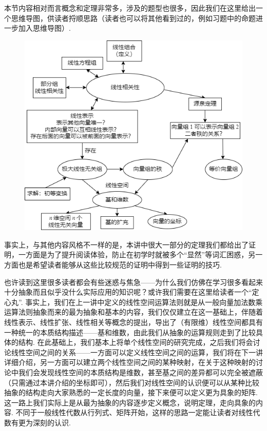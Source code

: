 \begin{summary}

    本节内容相对而言概念和定理非常多，涉及的题型也很多，因此我们在这里给出一个思维导图，供读者捋顺思路（读者也可以将其他看到过的，例如习题中的命题进一步加入思维导图）.
    \begin{figure}[htbp]
        \centering
        \includegraphics[scale=0.6]{figs/3-1.png}
    \end{figure}

    事实上，与其他内容风格不一样的是，本讲中很大一部分的定理我们都给出了证明，一方面是为了提升阅读体验，防止在初学时就被多个``显然''等词汇困惑，另一方面也是希望读者能够从这些比较规范的证明中得到一些证明的技巧.

    也许读到这里很多读者都会有些迷惑与焦急——为什么我们仿佛在学习很多看起来十分抽象而且似乎没什么实际应用的知识呢？或许我们需要在这里给读者一个``定心丸''. 事实上，我们在上一讲中定义的线性空间运算法则就是从一般向量加法数乘运算法则抽象而来的最为抽象和基本的内容，我们仅仅建立在这一基础上，伴随着线性表示、线性扩张、线性相关等概念的提出，导出了（有限维）线性空间都具有一种统一的本质结构描述——基和维数，由此我们从抽象的运算规则走到了比较具体的结构. 在此基础上，我们基本上将单个线性空间的研究完成，之后我们将会讨论线性空间之间的关系——一方面可以定义线性空间之间的运算，我们将在下一讲详细介绍，另一方面可以建立两个线性空间之间的某种映射，在关于这种映射的讨论中我们会发现线性空间的本质结构是维数，甚至基之间的差异都可以完全被遮蔽（只需通过本讲介绍的坐标即可），然后我们对线性空间的认识便可以从某种比较抽象的结构走向大家熟悉的一定长度的向量，接下来便可以定义更为具象的矩阵. 这一路上我们实际上是从最为抽象的内容逐步定义概念，说明定理，走向具象的内容. 不同于一般线性代数从行列式、矩阵开始，这样的思路一定能让读者对线性代数有更为深刻的认识.

\end{summary}

